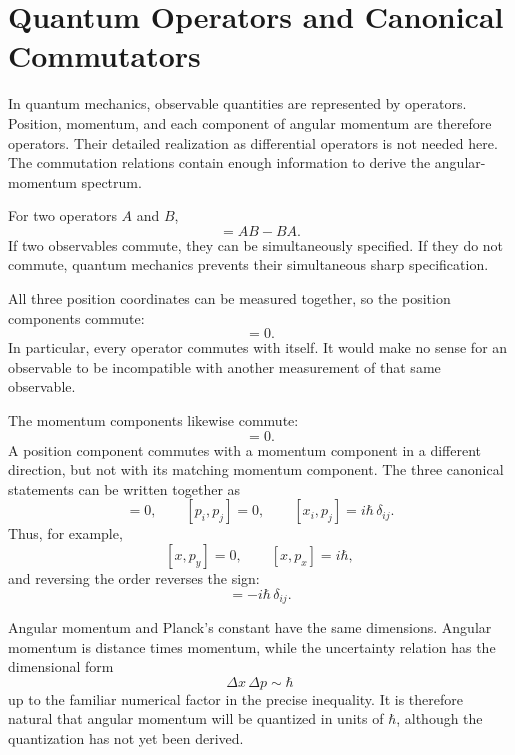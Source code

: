\section{Quantum Operators and Canonical Commutators}

In quantum mechanics, observable quantities are represented by operators. Position, momentum, and each component of angular momentum are therefore operators. Their detailed realization as differential operators is not needed here. The commutation relations contain enough information to derive the angular-momentum spectrum.

For two operators \(A\) and \(B\),
\begin{equation}
[A,B]=AB-BA.
\end{equation}
If two observables commute, they can be simultaneously specified. If they do not commute, quantum mechanics prevents their simultaneous sharp specification.

All three position coordinates can be measured together, so the position components commute:
\begin{equation}
[x_i,x_j]=0.
\end{equation}
In particular, every operator commutes with itself. It would make no sense for an observable to be incompatible with another measurement of that same observable.

The momentum components likewise commute:
\begin{equation}
[p_i,p_j]=0.
\end{equation}
A position component commutes with a momentum component in a different direction, but not with its matching momentum component. The three canonical statements can be written together as
\begin{equation}
[x_i,x_j]=0,\qquad
[p_i,p_j]=0,\qquad
[x_i,p_j]=i\hbar\,\delta_{ij}.
\end{equation}
Thus, for example,
\[
[x,p_y]=0,\qquad [x,p_x]=i\hbar,
\]
and reversing the order reverses the sign:
\begin{equation}
[p_j,x_i]=-i\hbar\,\delta_{ij}.
\end{equation}

Angular momentum and Planck's constant have the same dimensions. Angular momentum is distance times momentum, while the uncertainty relation has the dimensional form
\begin{equation}
\Delta x\,\Delta p\sim\hbar
\end{equation}
up to the familiar numerical factor in the precise inequality. It is therefore natural that angular momentum will be quantized in units of \(\hbar\), although the quantization has not yet been derived.

